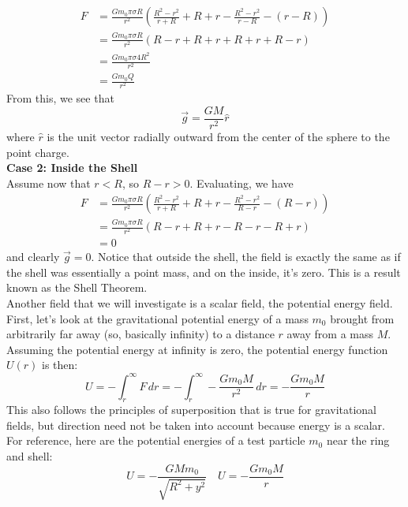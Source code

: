\begin{align*}
    F &= \frac{Gm_0\pi\sigma R}{r^2} \left(\frac{R^2-r^2}{r+R} + R+r - \frac{R^2-r^2}{r-R} - (r - R)\right) \\
    &= \frac{Gm_0\pi\sigma R}{r^2} (R-r + R+r + R+ r + R -r)\\
    &= \frac{Gm_0\pi\sigma 4R^2}{r^2} \\
    &= \frac{Gm_0Q}{r^2} 
\end{align*}
From this, we see that 
\[
    \vec g = \frac{GM}{r^2}\hat r
\]
where $\hat r$ is the unit vector radially outward from the center of the sphere to the point charge. \\ 
\textbf{Case 2: Inside the Shell} \\
Assume now that $r < R$, so $R - r> 0$. Evaluating, we have
\begin{align*}
    F &= \frac{Gm_0\pi\sigma R}{r^2} \left(\frac{R^2-r^2}{r+R} + R+r - \frac{R^2-r^2}{R-r} - (R-r)\right) \\
    &= \frac{Gm_0\pi\sigma R}{r^2} (R-r + R+r - R - r -R + r)\\
    &= 0
\end{align*}
and clearly $\vec g = 0$. Notice that outside the shell, the field is exactly the same as if the shell was essentially a point mass, and on the inside, it's zero. This is a result known as the Shell Theorem. \\
Another field that we will investigate is a scalar field, the potential energy field. First, let's look at the gravitational potential energy of a mass $m_0$ brought from arbitrarily far away (so, basically infinity) to a distance $r$ away from a mass $M$. Assuming the potential energy at infinity is zero, the potential energy function $U(r)$ is then:
\[
	U = - \int_r^{\infty} F \, dr = - \int_r^{\infty} -\frac{Gm_0M}{r^2} \, dr = -\frac{Gm_0M}{r}
\]
This also follows the principles of superposition that is true for gravitational fields, but direction need not be taken into account because energy is a scalar. For reference, here are the potential energies of a test particle $m_0$ near the ring and shell:
\[
	U = -\frac{GMm_0}{\sqrt{R^2 + y^2}} \quad U = -\frac{Gm_0M}{r}
\]
